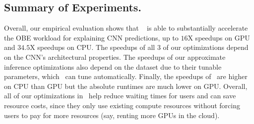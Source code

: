 \vspace{-2mm}
\subsection{Summary of Experiments.}
Overall, our empirical evaluation shows that \system~ is able to substantially accelerate the OBE workload for explaining CNN predictions, up to $16$X speedups on GPU and $34.5$X speedups on CPU. The speedups of all 3 of our optimizations depend on the CNN's architectural properties. The speedups of our approximate inference optimizations also depend on the dataset due to their tunable parameters, which \system ~can tune automatically. Finally, the speedups of \system ~are higher on CPU than GPU but the absolute runtimes are much lower on GPU. Overall, all of our optimizations in \system ~help reduce waiting times for users and can save resource costs, since they only use existing compute resources without forcing users to pay for more resources (say, renting more GPUs in the cloud).